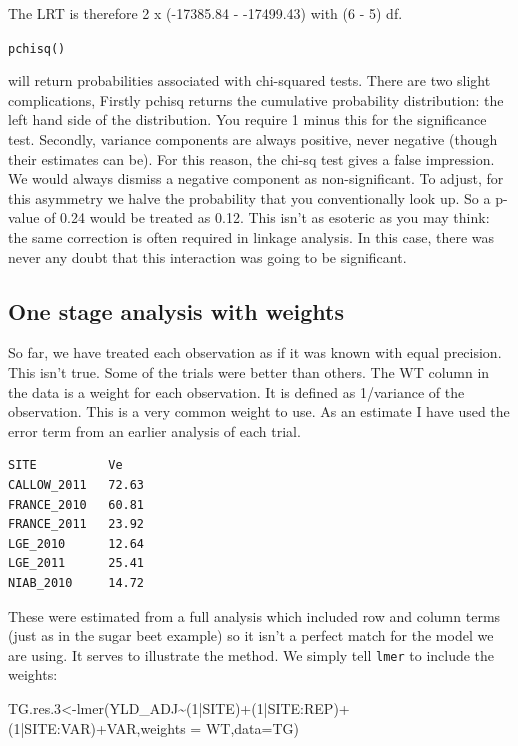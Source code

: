 \documentclass[
]{book}
\newenvironment{Shaded}{\begin{snugshade}}{\end{snugshade}}
\newcommand{\AttributeTok}[1]{\textcolor[rgb]{0.77,0.63,0.00}{#1}}
\newcommand{\DecValTok}[1]{\textcolor[rgb]{0.00,0.00,0.81}{#1}}
\newcommand{\FloatTok}[1]{\textcolor[rgb]{0.00,0.00,0.81}{#1}}
\newcommand{\FunctionTok}[1]{\textcolor[rgb]{0.00,0.00,0.00}{#1}}
\newcommand{\NormalTok}[1]{#1}
\newcommand{\OtherTok}[1]{\textcolor[rgb]{0.56,0.35,0.01}{#1}}
\newcommand{\SpecialCharTok}[1]{\textcolor[rgb]{0.00,0.00,0.00}{#1}}
\begin{document}
The LRT is therefore 2 x (-17385.84 - -17499.43) with (6 - 5) df.

\texttt{pchisq()}

will return probabilities associated with chi-squared tests. There are two slight complications, Firstly pchisq returns the cumulative probability distribution: the left hand side of the distribution. You require 1 minus this for the significance test. Secondly, variance components are always positive, never negative (though their estimates can be). For this reason, the chi-sq test gives a false impression. We would always dismiss a negative component as non-significant. To adjust, for this asymmetry we halve the probability that you conventionally look up. So a p-value of 0.24 would be treated as 0.12. This isn't as esoteric as you may think: the same correction is often required in linkage analysis. In this case, there was never any doubt that this interaction was going to be significant.

\hypertarget{one-stage-analysis-with-weights}{%
\subsection{One stage analysis with weights}\label{one-stage-analysis-with-weights}}

So far, we have treated each observation as if it was known with equal precision. This isn't true. Some of the trials were better than others. The WT column in the data is a weight for each observation. It is defined as 1/variance of the observation. This is a very common weight to use. As an estimate I have used the error term from an earlier analysis of each trial.

\begin{verbatim}
SITE          Ve
CALLOW_2011   72.63
FRANCE_2010   60.81
FRANCE_2011   23.92
LGE_2010      12.64
LGE_2011      25.41
NIAB_2010     14.72
\end{verbatim}

These were estimated from a full analysis which included row and column terms (just as in the sugar beet example) so it isn't a perfect match for the model we are using. It serves to illustrate the method. We simply tell \texttt{lmer} to include the weights:

\begin{Shaded}
\begin{Highlighting}[]
\NormalTok{TG.res}\FloatTok{.3}\OtherTok{\textless{}{-}}\FunctionTok{lmer}\NormalTok{(YLD\_ADJ}\SpecialCharTok{\textasciitilde{}}\NormalTok{(}\DecValTok{1}\SpecialCharTok{|}\NormalTok{SITE)}\SpecialCharTok{+}\NormalTok{(}\DecValTok{1}\SpecialCharTok{|}\NormalTok{SITE}\SpecialCharTok{:}\NormalTok{REP)}\SpecialCharTok{+}\NormalTok{(}\DecValTok{1}\SpecialCharTok{|}\NormalTok{SITE}\SpecialCharTok{:}\NormalTok{VAR)}\SpecialCharTok{+}\NormalTok{VAR,}\AttributeTok{weights =}\NormalTok{ WT,}\AttributeTok{data=}\NormalTok{TG)}
\end{Highlighting}
\end{Shaded}
\end{document}
